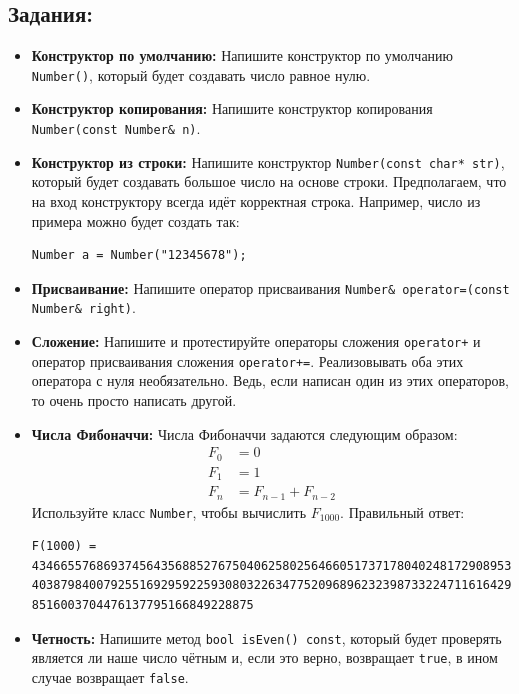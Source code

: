 \documentclass{article}
\begin{document}
\subsection*{Задания:}
\begin{itemize}
\item \textbf{Конструктор по умолчанию:} Напишите конструктор по умолчанию \texttt{Number()}, который будет создавать число равное нулю.
\item \textbf{Конструктор копирования:} Напишите конструктор копирования \texttt{Number(const Number\& n)}.
\item \textbf{Конструктор из строки:} Напишите конструктор \texttt{Number(const char* str)}, который будет создавать большое число на основе строки. Предполагаем, что на вход конструктору всегда идёт корректная строка. Например, число из примера можно будет создать так:
\begin{lstlisting}
Number a = Number("12345678");
\end{lstlisting}
\item \textbf{Присваивание:} Напишите оператор присваивания \texttt{Number\& operator=(const Number\& right)}.
\item \textbf{Сложение:} Напишите и протестируйте операторы сложения \texttt{operator+} и оператор присваивания сложения \texttt{operator+=}.  Реализовывать оба этих оператора с нуля необязательно. Ведь, если написан один из этих операторов, то очень просто написать другой.
\item \textbf{Числа Фибоначчи:} Числа Фибоначчи задаются следующим образом:
\begin{align*}
F_0 &= 0\\
F_1 &= 1\\
F_n &= F_{n-1} + F_{n-2}
\end{align*}
Используйте класс \texttt{Number}, чтобы вычислить $F_{1000}$. Правильный ответ:
\begin{verbatim}
F(1000) = 43466557686937456435688527675040625802564660517371780402481729089536555417949051890
40387984007925516929592259308032263477520968962323987332247116164299644090653318793829896964992
8516003704476137795166849228875
\end{verbatim}




\item \textbf{Четность:} Напишите метод \texttt{bool isEven() const}, который будет проверять является ли наше число чётным и, если это верно, возвращает \texttt{true}, в ином случае возвращает \texttt{false}.


\end{itemize}
\end{document}
